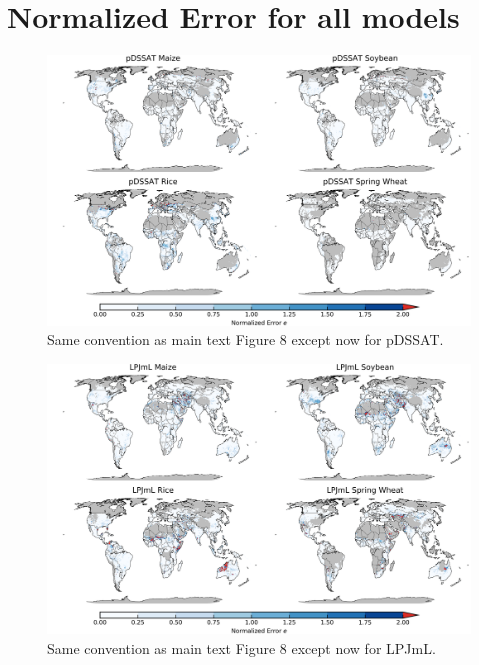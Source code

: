 \documentclass[10pt]{article}
\begin{document}
\clearpage
\section{Normalized Error for all models}

\begin{figure}[h!]
\centering
\includegraphics[width=15.5cm]{pDSSAT_spatial_error.png}
\caption{Same convention as main text Figure 8 except now for pDSSAT.}
\label{fig:pdssatnorm}
\end{figure}

\begin{figure}[h!]
\centering
\includegraphics[width=15.5cm]{LPJmL_spatial_error.png}
\caption{Same convention as main text Figure 8 except now for LPJmL.}
\label{fig:lpjmlnorm}
\end{figure}
\end{document}

